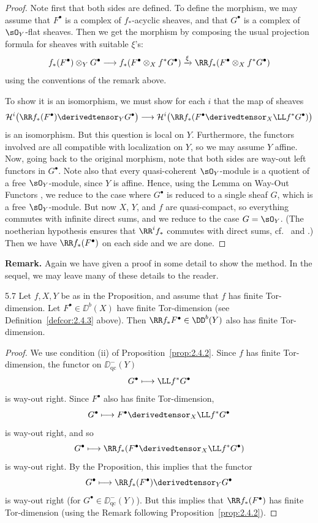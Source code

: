 \begin{proof}
Note first that both sides are defined. To define the morphism, we may assume that $F^\bullet$ is a complex of $f_*$-acyclic sheaves, and that $G^\bullet$ is a complex of $\sO_Y$-flat sheaves. Then we get the morphism by composing the usual projection formula for sheaves with suitable $\xi$'s:
\[
f_*(F^\bullet)\otimes_Y G^\bullet \longrightarrow f_*(F^\bullet\otimes_X f^*G^\bullet) \xrightarrow{\xi} \RR f_*(F^\bullet\otimes_X f^*G^\bullet)
\]
using the conventions of the remark above.

To show it is an isomorphism, we must show for each $i$ that the map of sheaves
\[
\mathcal{H}^i\big(\RR f_*(F^\bullet)\derivedtensor_Y G^\bullet\big) \longrightarrow \mathcal{H}^i\big(\RR f_*(F^\bullet\derivedtensor_X \LL f^*G^\bullet)\big)
\]
is an isomorphism. But this question is local on $Y$. Furthermore, the functors involved are all compatible with localization on $Y$, so we may assume $Y$ affine. Now, going back to the original morphism, note that both sides are way-out left functors in $G^\bullet$. Note also that every quasi-coherent $\sO_Y$-module is a quotient of a free $\sO_Y$-module, since $Y$ is affine. Hence, using the Lemma on Way-Out Functors , we reduce to the case where $G^\bullet$ is reduced to a single sheaf $G$, which is a free $\sO_Y$-module. But now $X$, $Y$, and $f$ are quasi-compact, so everything commutes with infinite direct sums, and we reduce to the case $G=\sO_Y$. (The noetherian hypothesis ensures that $\RR^if_*$ commutes with direct sums, cf.\ \cite[.2]{T} and \cite[\nopp II,~\S4.12]{G}.) Then we have $\RR f_*(F^\bullet)$ on each side and we are done.
\end{proof}

\textbf{Remark.}
Again we have given a proof in some detail to show the method. In the sequel, we may leave many of these details to the reader.

\begin{bookcorollary}{5.7}\label{cor:2.5.7}
Let $f,X,Y$ be as in the Proposition, and assume that $f$ has finite Tor-dimension. Let $F^\bullet\in\DD^b(X)$ have finite Tor-dimension (see Definition~\ref{defcor:2.4.3} above). Then $\RR f_*F^\bullet\in\DD^b(Y)$ also has finite Tor-dimension.
\end{bookcorollary}

\begin{proof}
We use condition (ii) of Proposition~\ref{prop:2.4.2}. Since $f$ has finite Tor-dimension, the functor on $\DD_{\mathrm{qc}}^-(Y)$
\[
G^\bullet \longmapsto \LL f^*G^\bullet
\]
is way-out right. Since $F^\bullet$ also has finite Tor-dimension,
\[
G^\bullet \longmapsto F^\bullet \derivedtensor_X \LL f^*G^\bullet
\]
is way-out right, and so
\[
G^\bullet \longmapsto \RR f_*(F^\bullet \derivedtensor_X \LL f^*G^\bullet)
\]
is way-out right. By the Proposition, this implies that the functor
\[
G^\bullet \longmapsto \RR f_*(F^\bullet) \derivedtensor_Y G^\bullet
\]
is way-out right (for $G^\bullet\in\DD_{\mathrm{qc}}^-(Y)$). But this implies that $\RR f_*(F^\bullet)$ has finite Tor-dimension (using the Remark following Proposition~\ref{prop:2.4.2}).
\end{proof}

